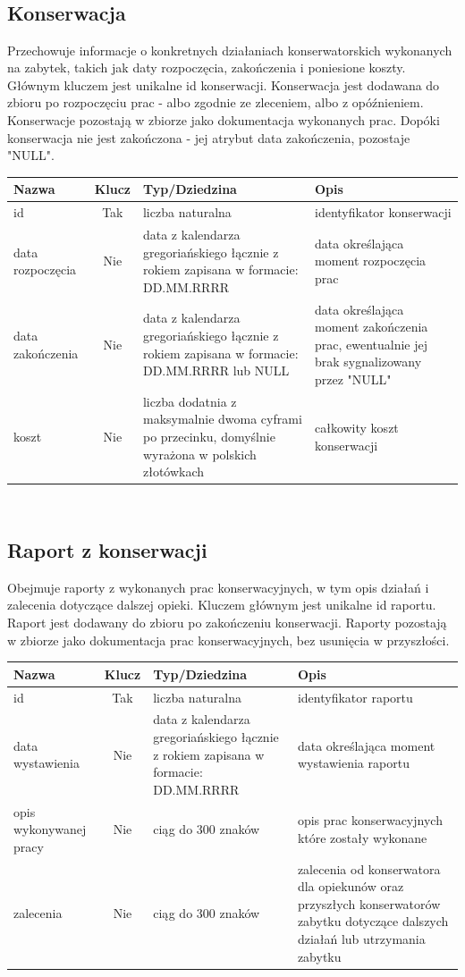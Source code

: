 \documentclass{article}
\begin{document}
\subsection*{\\Konserwacja}
Przechowuje informacje o konkretnych działaniach konserwatorskich wykonanych na zabytek, takich jak daty rozpoczęcia, zakończenia i poniesione koszty. Głównym kluczem jest unikalne id konserwacji. Konserwacja jest dodawana do zbioru po rozpoczęciu prac - albo zgodnie ze zleceniem, albo z opóźnieniem. Konserwacje pozostają w zbiorze jako dokumentacja wykonanych prac. Dopóki konserwacja nie jest zakończona - jej atrybut data zakończenia, pozostaje "NULL".  
\begin{longtable}{|C{3cm}|c|C{4.5cm}|C{5cm}|}
\hline
\textbf{Nazwa} & \textbf{Klucz} & \textbf{Typ/Dziedzina} & \textbf{Opis} \\ \hline
id & Tak & liczba naturalna & identyfikator konserwacji \\ \hline 
data rozpoczęcia & Nie & data z kalendarza gregoriańskiego łącznie z rokiem zapisana w formacie: DD.MM.RRRR & data określająca moment rozpoczęcia prac \\ \hline 
data zakończenia & Nie & data z kalendarza gregoriańskiego łącznie z rokiem zapisana w formacie: DD.MM.RRRR lub NULL & data określająca moment zakończenia prac, ewentualnie jej brak sygnalizowany przez "NULL" \\ \hline
koszt & Nie & liczba dodatnia z maksymalnie dwoma cyframi po przecinku, domyślnie wyrażona w polskich złotówkach & całkowity koszt konserwacji \\ \hline
\end{longtable}

\subsection*{\\Raport z konserwacji}
Obejmuje raporty z wykonanych prac konserwacyjnych, w tym opis działań i zalecenia dotyczące dalszej opieki. Kluczem głównym jest unikalne id raportu. Raport jest dodawany do zbioru po zakończeniu konserwacji. Raporty pozostają w zbiorze jako dokumentacja prac konserwacyjnych, bez usunięcia w przyszłości.   
\begin{longtable}{|C{3cm}|c|C{4.5cm}|C{5cm}|}
\hline
\textbf{Nazwa} & \textbf{Klucz} & \textbf{Typ/Dziedzina} & \textbf{Opis} \\ \hline
id & Tak & liczba naturalna & identyfikator raportu \\ \hline 
data wystawienia & Nie & data z kalendarza gregoriańskiego łącznie z rokiem zapisana w formacie: DD.MM.RRRR  & data określająca moment wystawienia raportu \\ \hline 
opis wykonywanej pracy & Nie & ciąg do 300 znaków & opis prac konserwacyjnych które zostały wykonane \\ \hline
zalecenia & Nie & ciąg do 300 znaków & zalecenia od konserwatora dla opiekunów oraz przyszłych konserwatorów zabytku dotyczące dalszych działań lub utrzymania zabytku \\ \hline
\end{longtable}
\end{document}
